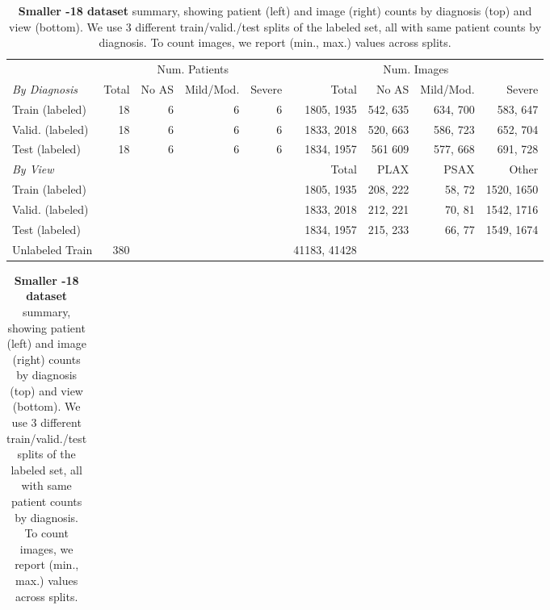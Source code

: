 

\begin{table}[!t]
    \centering
    {\small %
    \begin{tabular}{l|r|rrr|r|rrr}
		& \multicolumn{4}{c}{Num. Patients}
		& \multicolumn{4}{c}{Num. Images}
	\\
    \textit{By Diagnosis}
    	& Total
    	& No AS  & Mild/Mod. & Severe    	
    	& Total
    	& No AS  & Mild/Mod. & Severe \\
    \hline
    Train (labeled) 
		& 18 & 6 & 6 & 6
    	& 1805, 1935
    	& 542, 635 & 634, 700 & 583, 647
	\\
    Valid. (labeled) 
    	& 18 & 6 & 6 & 6
    	& 1833, 2018
    	& 520, 663 & 586, 723 & 652, 704 
    \\
    Test (labeled) 
		& 18 & 6 & 6 & 6
    	& 1834, 1957
    	& 561 609 & 577, 668 & 691, 728
	\\ \hline
    \textit{By View}
		& & & &
    	& Total
    	& PLAX  & PSAX & Other
    \\ \hline
    Train (labeled) 
		& & & &
    	& 1805, 1935
    	& 208, 222 & 58, 72 & 1520, 1650
    \\
    Valid. (labeled) 
		& & & &
    	& 1833, 2018
    	& 212, 221 & 70, 81 & 1542, 1716
	\\
    Test (labeled) 
		& & & &
    	& 1834, 1957
    	& 215, 233 & 66, 77 & 1549, 1674
    \\
	\hline
    Unlabeled Train 
		& 380 & &  &
    	& 41183, 41428
    \end{tabular}
    }%
    \caption{\textbf{Smaller -18 dataset} summary, showing patient (left) and image (right) counts by diagnosis (top) and view (bottom).
    We use 3 different train/valid./test splits of the labeled set, all with same patient counts by diagnosis. To count images, we report (min., max.) values across splits.
    }%
    \label{tab:patient_counts_small}
    \label{tab:image_counts_small}
\bigskip
    {\small %
    \begin{tabular}{l|r|rrr|r|rrr}

\end{tabular}}
\end{table}

